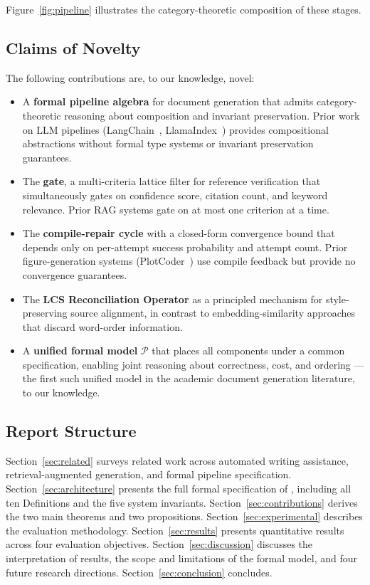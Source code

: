 Figure~\ref{fig:pipeline} illustrates the category-theoretic composition of these stages.

\subsection{Claims of Novelty}

The following contributions are, to our knowledge, novel:

\begin{itemize}
  \item A \textbf{formal pipeline algebra} for document generation that admits
        category-theoretic reasoning about composition and invariant preservation.
        Prior work on LLM pipelines (LangChain~\cite{chase2022langchain},
        LlamaIndex~\cite{liu2022llamaindex}) provides compositional abstractions
        without formal type systems or invariant preservation guarantees.
  \item The \textbf{\cgrag{} gate}, a multi-criteria lattice filter for reference
        verification that simultaneously gates on confidence score, citation count,
        and keyword relevance.
        Prior RAG systems gate on at most one criterion at a time.
  \item The \textbf{\tvg{} compile-repair cycle} with a closed-form convergence bound
        that depends only on per-attempt success probability and attempt count.
        Prior figure-generation systems (PlotCoder~\cite{chen2021plotcoder}) use
        compile feedback but provide no convergence guarantees.
  \item The \textbf{LCS Reconciliation Operator} as a principled mechanism for
        style-preserving source alignment, in contrast to embedding-similarity approaches
        that discard word-order information.
  \item A \textbf{unified formal model} $\mathcal{P}$ that places all components under
        a common specification, enabling joint reasoning about correctness, cost,
        and ordering — the first such unified model in the academic document
        generation literature, to our knowledge.
\end{itemize}

\subsection{Report Structure}

Section~\ref{sec:related} surveys related work across automated writing assistance,
retrieval-augmented generation, and formal pipeline specification.
Section~\ref{sec:architecture} presents the full formal specification of \sys{},
including all ten Definitions and the five system invariants.
Section~\ref{sec:contributions} derives the two main theorems and two propositions.
Section~\ref{sec:experimental} describes the evaluation methodology.
Section~\ref{sec:results} presents quantitative results across four evaluation objectives.
Section~\ref{sec:discussion} discusses the interpretation of results, the scope
and limitations of the formal model, and four future research directions.
Section~\ref{sec:conclusion} concludes.
